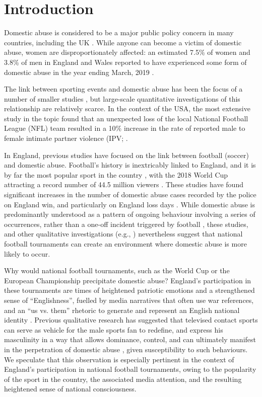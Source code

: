 \documentclass[12pt, a4paper]{article}
\begin{document}
\newpage
\RaggedRight
\section{Introduction}


Domestic abuse is considered to be a major public policy concern in many countries, including the UK \cite{ep}. While anyone can become a victim of domestic abuse, women are disproportionately affected: an estimated 7.5\% of women and 3.8\% of men in England and Wales reported to have experienced some form of domestic abuse in the year ending March, 2019 \cite{ONS2019}.


The link between sporting events and domestic abuse has been the focus of a number of smaller studies \cite{Williams2014}, but large-scale quantitative investigations of this relationship are relatively scarce. In the context of the USA, the most extensive study in the topic found that an unexpected loss of the local National Football League (NFL) team resulted in a 10\% increase in the rate of reported male to female intimate partner violence (IPV; .

In England, previous studies have focused on the link between football (soccer) and domestic abuse. Football's history is inextricably linked to England, and it is by far the most popular sport in the country \cite{Parry2014}, with the 2018 World Cup attracting a record number of 44.5 million viewers \cite{BBC}. These studies have found significant increases in the number of domestic abuse cases recorded by the police on England win, and particularly on England loss days \cite{Brimicombe2012, Kirby2014}. While domestic abuse is predominantly understood as a pattern of ongoing behaviour involving a series of occurrences, rather than a one-off incident triggered by football \cite{Brooks-Hay2018}, these studies, and other qualitative investigations (e.g., ) nevertheless suggest that national football tournaments can create an environment where domestic abuse is more likely to occur.




Why would national football tournaments, such as the World Cup or the European Championship precipitate domestic abuse? England's participation in these tournaments are times of heightened patriotic emotions and a strengthened sense of ``Englishness'', fuelled by media narratives that often use war references, and an ``us vs. them'' rhetoric to generate and represent an English national identity \cite{Vincent2014}. Previous qualitative research has suggested that televised contact sports can serve as vehicle for the male sports fan to redefine, and express his masculinity in a way that allows dominance, control, and can ultimately manifest in the perpetration of domestic abuse \cite{Sabo,Swallow}, given susceptibility to such behaviours. We speculate that this observation is especially pertinent in the context of England's participation in national football tournaments, owing to the popularity of the sport in the country, the associated media attention, and the resulting heightened sense of national consciousness.
\end{document}
